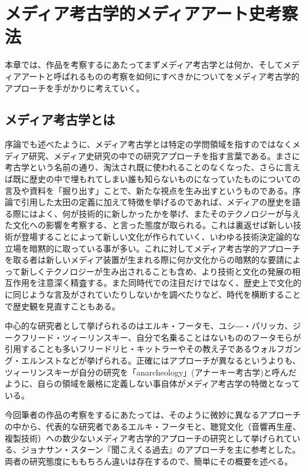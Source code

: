 \documentclass[a4paper,report]{jsbook}
\begin{document}
\chapter{メディア考古学的メディアアート史考察法}\label{ux30e1ux30c7ux30a3ux30a2ux8003ux53e4ux5b66ux7684ux30e1ux30c7ux30a3ux30a2ux30a2ux30fcux30c8ux53f2ux8003ux5bdfux6cd5}

本章では、作品を考察するにあたってまずメディア考古学とは何か、そしてメディアアートと呼ばれるものの考察を如何にすべきかについてをメディア考古学的アプローチを手がかりに考えていく。

\section{メディア考古学とは}\label{ux30e1ux30c7ux30a3ux30a2ux8003ux53e4ux5b66ux3068ux306f}

序論でも述べたように、メディア考古学とは特定の学問領域を指すのではなくメディア研究、メディア史研究の中での研究アプローチを指す言葉である。まさに考古学という名前の通り、淘汰され既に使われることのなくなった、さらに言えば既に歴史の中で埋もれてしまい誰も知らないものになっていたものについての言及や資料を「掘り出す」ことで、新たな視点を生み出すというものである。序論で引用した太田の定義に加えて特徴を挙げるのであれば、メディアの歴史を語る際にはよく、何が技術的に新しかったかを挙げ、またそのテクノロジーが与えた文化への影響を考察する、と言った態度が取られる。これは裏返せば新しい技術が登場することによって新しい文化が作られていく、いわゆる技術決定論的な立場を暗黙的に取っている事が多い。これに対してメディア考古学的アプローチを取る者は新しいメディア装置が生まれる際に何か文化からの暗黙的な要請によって新しくテクノロジーが生み出されることも含め、より技術と文化の発展の相互作用を注意深く精査する。また同時代での注目だけではなく、歴史上で文化的に同じような言及がされていたりしないかを調べたりなど、時代を横断することで歴史観を見直すこともある。

中心的な研究者として挙げられるのはエルキ・フータモ、ユシ―・パリッカ、ジークフリード・ツィーリンスキー、自分で名乗ることはないもののフータモらが引用することも多いフリードリヒ・キットラーやその教え子であるウォルフガング・エルンストなどが挙げられる。正確にはアプローチが異なるというよりも、ツィーリンスキーが自分の研究を「anarcheology」(アナーキー考古学)と呼んだように、自らの領域を厳格に定義しない事自体がメディア考古学の特徴となっている。

今回筆者の作品の考察をするにあたっては、そのように微妙に異なるアプローチの中から、代表的な研究者であるエルキ・フータモと、聴覚文化（音響再生産、複製技術）への数少ないメディア考古学的アプローチの研究として挙げられている\autocite{ohta:mediaarch}、ジョナサン・スターン『聞こえくる過去』\autocite{o_audiblepast}のアプローチを主に参考とした。両者の研究態度にももちろん違いは存在するので、簡単にその概要を述べる。
\end{document}
